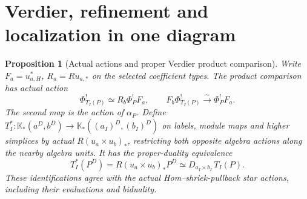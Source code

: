 \documentclass[11pt]{article}
\newtheorem{proposition}{Proposition}[section]
\theoremstyle{definition}
\theoremstyle{remark}
\begin{document}
\section{Verdier, refinement and localization in one diagram}
\label{sec:joint-descent}
\begin{proposition}[Actual actions and proper Verdier product comparison]
\label{prop:product-verdier}
Write $F_a=u_{a,H}^*$, $R_a=Ru_{a,*}$ on the selected coefficient
types.  The product comparison has actual action
\[
 \Phi_{T_I(P)}^!\simeq R_b\Phi_P^!F_a,
 \qquad F_b\Phi_{T_I(P)}^!\xrightarrow{\sim}\Phi_P^!F_a.
\]
The second map is the action of $\alpha_P$.  Define
$T_I^*:\mathbb K_*(a^D,b^D)\to\mathbb K_*((a_I)^D,(b_I)^D)$
on labels, module maps and higher simplices by actual
$R(u_a\times u_b)_*$, restricting both opposite algebra actions
along the nearby algebra units.  It has the proper-duality equivalence
\begin{equation}
 T_I^*(P^D)=R(u_a\times u_b)_*P^D
       \simeq D_{a_I\times b_I}\,T_I(P).
 \label{eq:proper-product-duality}
\end{equation}
These identifications agree with the actual Hom--shriek-pullback
star actions, including their evaluations and biduality.
\end{proposition}
\end{document}
